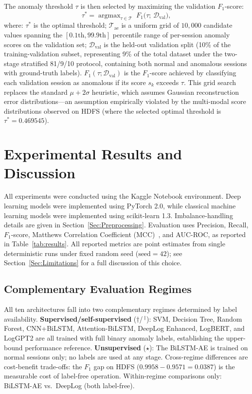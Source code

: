 \documentclass{elektr}
\begin{document}
The anomaly threshold $\tau$ is then selected by maximizing the
validation $F_1$-score:
\begin{equation}
\tau^* = \mathop{\arg\max}_{\tau \in \mathcal{T}}\;
F_1\!\bigl(\tau;\,\mathcal{D}_{\text{val}}\bigr),
\label{eq:threshold}
\end{equation}
where: $\tau^*$ is the optimal threshold; $\mathcal{T}_{\text{ae}}$ is a uniform grid of
$10{,}000$ candidate values spanning the $[0.1\text{th}, 99.9\text{th}]$ percentile
range of per-session anomaly scores on the validation set;
$\mathcal{D}_{\text{val}}$ is the held-out
validation split (10\% of the training-validation subset, representing 9\% of the total dataset under the two-stage stratified 81/9/10 protocol,
containing both normal and anomalous sessions with ground-truth labels).
$F_1(\tau;\mathcal{D}_{\text{val}})$
is the $F_1$-score achieved by classifying each validation session as anomalous
if its score $s_k$ exceeds $\tau$. This grid search replaces the
standard $\mu{+}2\sigma$ heuristic, which assumes Gaussian reconstruction error
distributions---an assumption empirically violated by the multi-modal score
distributions observed on HDFS (where the selected optimal threshold is $\tau^*{=}0.469545$).

\section{Experimental Results and Discussion}
\label{Sec:Results}

All experiments were conducted using the Kaggle Notebook environment. Deep learning models were implemented using PyTorch 2.0, while classical machine learning models were implemented using scikit-learn 1.3. Imbalance-handling details are given in Section~\ref{Sec:Preprocessing}. Evaluation uses Precision, Recall,
$F_1$-score, Matthews Correlation Coefficient (MCC)~\cite{ref20}, and AUC-ROC, as reported in
Table~\ref{tab:results}. All reported metrics are point estimates from single deterministic runs under fixed random seed ($\text{seed}=42$); see Section~\ref{Sec:Limitations} for a full discussion of this choice.

\subsection{Complementary Evaluation Regimes}
\label{Sec:Regimes}

All ten architectures fall into two complementary regimes determined by label availability.
\textbf{Supervised/self-supervised} ($\dagger$/\,$^\ddagger$): SVM, Decision Tree, Random Forest,
CNN+BiLSTM, Attention-BiLSTM, DeepLog Enhanced, LogBERT, and LogGPT2 are all trained with
full binary anomaly labels, establishing the upper-bound performance reference.
\textbf{Unsupervised} ($\star$): The BiLSTM-AE is trained on normal sessions only;
no labels are used at any stage. Cross-regime differences are cost-benefit trade-offs:
the $F_1$ gap on HDFS ($0.9958-0.9571{=}0.0387$) is the measurable cost of label-free
operation. Within-regime comparisons only: BiLSTM-AE vs.\ DeepLog (both label-free).
\end{document}
